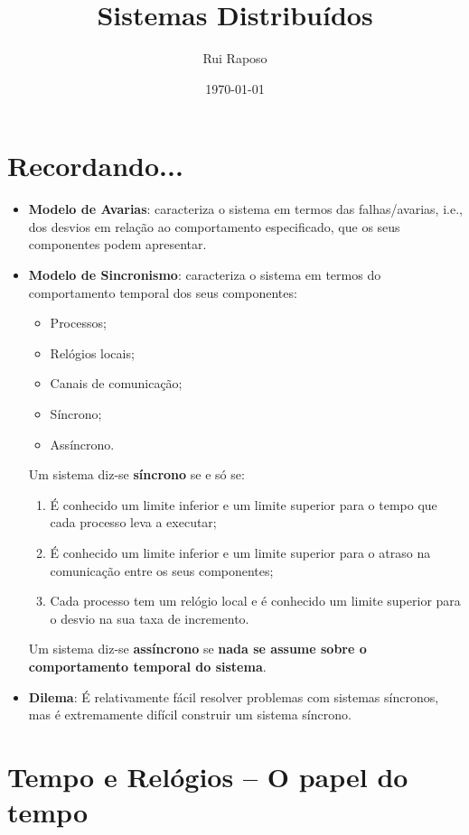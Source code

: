 \documentclass{article}
\date{\today \\ \currenttime}
\title{Sistemas Distribuídos}
\author{Rui Raposo}
\begin{document}
\maketitle

\section{Recordando...}

\begin{itemize}
	\item \textbf{Modelo de Avarias}: caracteriza o sistema em termos das falhas/avarias, i.e., dos desvios em relação ao comportamento especificado, que os seus componentes podem apresentar.
	\item \textbf{Modelo de Sincronismo}: caracteriza o sistema em termos do comportamento temporal dos seus componentes:
		\begin{itemize}
			\item Processos;
			\item Relógios locais;
			\item Canais de comunicação;
			\item Síncrono;
			\item Assíncrono.
		\end{itemize}
		Um sistema diz-se \textbf{síncrono} se e só se:
		\begin{enumerate}
			\item É conhecido um limite inferior e um limite superior para o tempo que cada processo leva a executar;
			\item É conhecido um limite inferior e um limite superior para o atraso na comunicação entre os seus componentes;
			\item Cada processo tem um relógio local e é conhecido um limite superior para o desvio na sua taxa de incremento.
		\end{enumerate}
		Um sistema diz-se \textbf{assíncrono} se \textbf{nada se assume sobre o comportamento temporal do sistema}.
		\item \textbf{Dilema}: É relativamente fácil resolver problemas com sistemas síncronos, mas é extremamente difícil construir um sistema síncrono.
\end{itemize}

\section{Tempo e Relógios -- O papel do tempo}
\end{document}
